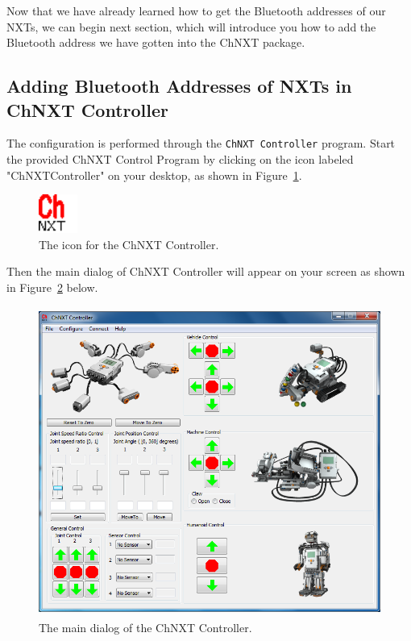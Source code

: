 \documentclass[11pt]{article}
\begin{document}
Now that we have already learned how to get the Bluetooth addresses of our NXTs, we can begin next section, which
will introduce you how to add the Bluetooth address we have gotten into the ChNXT package.

\subsection{Adding Bluetooth Addresses of NXTs in ChNXT Controller}
The configuration is performed through the \texttt{ChNXT Controller} program. Start the 
provided ChNXT Control Program by clicking on the icon labeled "ChNXTController" on your desktop,
as shown in Figure~\ref{fig:chnxt_icon}.

\begin{figure}[H]
  \begin{center}
    \includegraphics[height=0.5in]{figure/configuration/chnxt.png}
    \caption{The icon for the ChNXT Controller.\label{fig:chnxt_icon}}
  \end{center}
\end{figure}

Then the main dialog of ChNXT Controller will appear on your screen as shown in Figure~\ref{fig:main_dialog} below.

\begin{figure}[H]
  \begin{center}
    \includegraphics[height=4in]{figure/configuration/mainDlg.png}
    \caption{The main dialog of the ChNXT Controller.\label{fig:main_dialog}}
  \end{center}
\end{figure}
\end{document}

